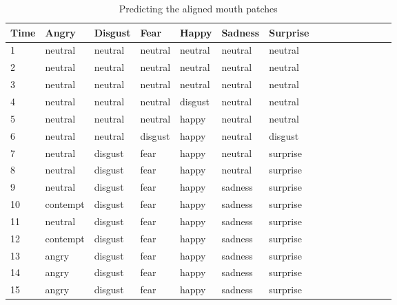 \begin{table}[bp]
\centering
\caption{Predicting the aligned mouth patches}
\label{table:predict_mouth}

\begin{tabular}{|*{15}{p{1.34cm}<{\centering}|}|}
\hline
Time & Angry &  Disgust  & Fear & Happy & Sadness & Surprise  \\
\hline
1 & neutral & neutral & neutral & neutral & neutral & neutral \\
2 & neutral & neutral & neutral & neutral & neutral & neutral \\
3 & neutral & neutral & neutral & neutral & neutral & neutral \\
4 & neutral & neutral & neutral & disgust & neutral & neutral \\
5 & neutral & neutral &neutral & happy & neutral & neutral \\
6 & neutral & neutral & disgust & happy & neutral & disgust \\
7 & neutral & disgust & fear & happy & neutral & surprise \\
8 & neutral & disgust & fear & happy & neutral & surprise \\
9 & neutral & disgust & fear & happy & sadness & surprise \\
10 & contempt & disgust & fear & happy & sadness & surprise \\
11 & neutral & disgust & fear & happy & sadness & surprise \\
12 & contempt & disgust & fear & happy & sadness & surprise \\
13 & angry & disgust & fear & happy & sadness & surprise \\
14 & angry & disgust & fear & happy & sadness & surprise \\
15 & angry & disgust & fear & happy & sadness & surprise\\

\hline
\end{tabular}
\end{table}


